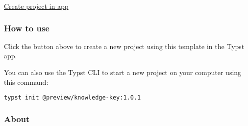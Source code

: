 \begin{Shaded}
\begin{Highlighting}[]

\NormalTok{)}

\end{Highlighting}
\end{Shaded}

\href{/app?template=knowledge-key&version=1.0.1}{Create project in app}

\subsubsection{How to use}\label{how-to-use}

Click the button above to create a new project using this template in
the Typst app.

You can also use the Typst CLI to start a new project on your computer
using this command:

\begin{verbatim}
typst init @preview/knowledge-key:1.0.1
\end{verbatim}



\subsubsection{About}\label{about}

